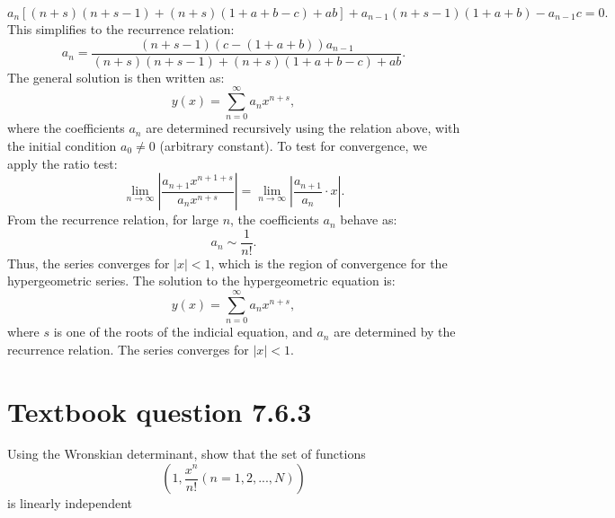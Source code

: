 \documentclass[12pt]{article}
\begin{document}
        \[
        a_n \left[(n+s)(n+s-1) + (n+s)(1+a+b-c) + ab\right] + a_{n-1}(n+s-1)(1+a+b) - a_{n-1}c = 0.
        \]
        This simplifies to the recurrence relation:
        \[
        a_n = \frac{(n+s-1)(c - (1+a+b))a_{n-1}}{(n+s)(n+s-1) + (n+s)(1+a+b-c) + ab}.
        \]
        The general solution is then written as:
        \[
        y(x) = \sum_{n=0}^\infty a_n x^{n+s},
        \]
        where the coefficients \(a_n\) are determined recursively using the relation above, with the initial condition \(a_0 \neq 0\) (arbitrary constant).
        To test for convergence, we apply the ratio test:
        \[
        \lim_{n \to \infty} \left| \frac{a_{n+1}x^{n+1+s}}{a_nx^{n+s}} \right| = \lim_{n \to \infty} \left| \frac{a_{n+1}}{a_n} \cdot x \right|.
        \]
        From the recurrence relation, for large \(n\), the coefficients \(a_n\) behave as:
        \[
        a_n \sim \frac{1}{n!}.
        \]
        Thus, the series converges for \(|x| < 1\), which is the region of convergence for the hypergeometric series.
        The solution to the hypergeometric equation is:
        \[
        y(x) = \sum_{n=0}^\infty a_n x^{n+s},
        \]
        where \(s\) is one of the roots of the indicial equation, and \(a_n\) are determined by the recurrence relation.
        The series converges for \(|x| < 1\).

\section*{Textbook question 7.6.3}
    Using the Wronskian determinant, show that the set of functions 
    \[
        \left(1, \frac{x^n}{n!} (n=1, 2, ..., N) \right)
    \]
    is linearly independent
\end{document}
